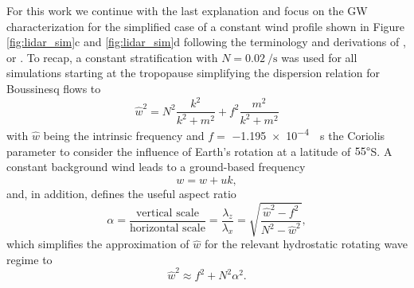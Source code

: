 For this work we continue with the last explanation and focus on the GW characterization for the simplified case of a constant wind profile shown in Figure \ref{fig:lidar_sim}c and \ref{fig:lidar_sim}d following the terminology and derivations of \textcite[]{gill_atmosphere-ocean_1982}, \textcite[]{fritts_gravity_2003} or \textcite[]{dornbrack_interpretation_2017}. To recap, a constant stratification with $N=\SI{0.02}{\per \second}$ was used for all simulations starting at the tropopause simplifying the dispersion relation for Boussinesq flows to
\begin{equation}
    \hat{w}^2 = N^2 \frac{k^2}{k^2+m^2} + f^2 \frac{m^2}{k^2+m^2}
    \label{equ_lid:dispersion}
\end{equation}
with $\hat{w}$ being the intrinsic frequency and $f=$ \SI{-1.195e-4}{\per \second} the Coriolis parameter to consider the influence of Earth's rotation at a latitude of $55\degree$S. A constant background wind leads to a ground-based frequency
\begin{equation}
    w = \hat{w} + uk,
    \label{equ_lid:omega}
\end{equation}
and, in addition, \textcite{gill_atmosphere-ocean_1982} defines the useful aspect ratio
\begin{equation}
    \alpha = \frac{\text{vertical scale}}{\text{horizontal scale}} = \frac{\lambda_z}{\lambda_x} = \sqrt{\frac{\hat{w}^2-f^2}{N^2-\hat{w}^2}},
    \label{equ_lid:alpha}
\end{equation}
which simplifies the approximation of $\hat{w}$ for the relevant hydrostatic rotating wave regime to
\begin{equation}
    \hat{w}^2 \approx f^2 + N^2 \alpha^2.
    \label{equ_lid:omega_simp}
\end{equation}
